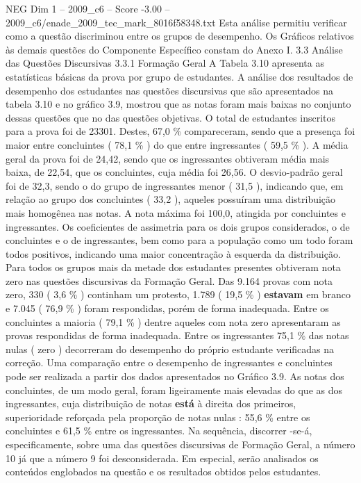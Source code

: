 \begin{textsample}{NEG Dim 1 – 2009\_c6 – Score -3.00 – 2009\_c6/enade\_2009\_tec\_mark\_8016f58348.txt}
Esta análise permitiu verificar como a questão discriminou entre os grupos de desempenho.
Os Gráficos relativos às demais questões do Componente Específico constam do Anexo I. 3.3 Análise das Questões Discursivas 3.3.1 Formação Geral A Tabela 3.10 apresenta as estatísticas básicas da prova por grupo de estudantes.
A análise dos resultados de desempenho dos estudantes nas questões discursivas que são apresentados na tabela 3.10 e no gráfico 3.9, mostrou que as notas foram mais baixas no conjunto dessas questões que no das questões objetivas.
O total de estudantes inscritos para a prova foi de 23301.
Destes, 67,0 \% compareceram, sendo que a presença foi maior entre concluintes ( 78,1 \% ) do que entre ingressantes ( 59,5 \% ).
A média geral da prova foi de 24,42, sendo que os ingressantes obtiveram média mais baixa, de 22,54, que os concluintes, cuja média foi 26,56.
O desvio-padrão geral foi de 32,3, sendo o do grupo de ingressantes menor ( 31,5 ), indicando que, em relação ao grupo dos concluintes ( 33,2 ), aqueles possuíram uma distribuição mais homogênea nas notas.
A nota máxima foi 100,0, atingida por concluintes e ingressantes.
Os coeficientes de assimetria para os dois grupos considerados, o de concluintes e o de ingressantes, bem como para a população como um todo foram todos positivos, indicando uma maior concentração à esquerda da distribuição.
Para todos os grupos mais da metade dos estudantes presentes obtiveram nota zero nas questões discursivas da Formação Geral.
Das 9.164 provas com nota zero, 330 ( 3,6 \% ) continham um protesto, 1.789 ( 19,5 \% ) \textbf{estavam} em branco e 7.045 ( 76,9 \% ) foram respondidas, porém de forma inadequada.
Entre os concluintes a maioria ( 79,1 \% ) dentre aqueles com nota zero apresentaram as provas respondidas de forma inadequada.
Entre os ingressantes 75,1 \% das notas nulas ( zero ) decorreram do desempenho do próprio estudante verificadas na correção.
Uma comparação entre o desempenho de ingressantes e concluintes pode ser realizada a partir dos dados apresentados no Gráfico 3.9.
As notas dos concluintes, de um modo geral, foram ligeiramente mais elevadas do que as dos ingressantes, cuja distribuição de notas \textbf{está} à direita dos primeiros, superioridade reforçada pela proporção de notas nulas : 55,6 \% entre os concluintes e 61,5 \% entre os ingressantes.
Na sequência, discorrer -se-á, especificamente, sobre uma das questões discursivas de Formação Geral, a número 10 já que a número 9 foi desconsiderada.
Em especial, serão analisados os conteúdos englobados na questão e os resultados obtidos pelos estudantes.

\end{textsample}
